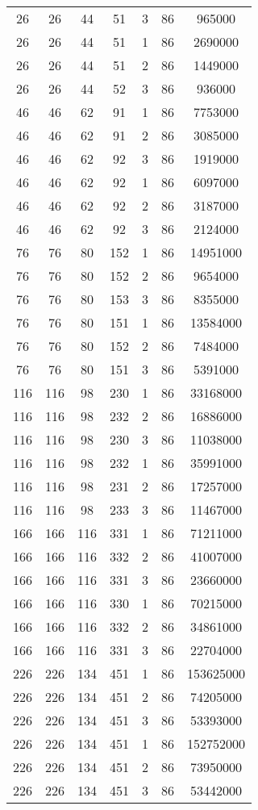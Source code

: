 \documentclass[a4paper,11pt]{article}
\begin{document}
\begin{longtable}{ |c|c|c|c|c|c|c| }
26 & 26 & 44 & 51 & 3 & 86 & 965000 \\
26 & 26 & 44 & 51 & 1 & 86 & 2690000 \\
26 & 26 & 44 & 51 & 2 & 86 & 1449000 \\
26 & 26 & 44 & 52 & 3 & 86 & 936000 \\
46 & 46 & 62 & 91 & 1 & 86 & 7753000 \\
46 & 46 & 62 & 91 & 2 & 86 & 3085000 \\
46 & 46 & 62 & 92 & 3 & 86 & 1919000 \\
46 & 46 & 62 & 92 & 1 & 86 & 6097000 \\
46 & 46 & 62 & 92 & 2 & 86 & 3187000 \\
46 & 46 & 62 & 92 & 3 & 86 & 2124000 \\
76 & 76 & 80 & 152 & 1 & 86 & 14951000 \\
76 & 76 & 80 & 152 & 2 & 86 & 9654000 \\
76 & 76 & 80 & 153 & 3 & 86 & 8355000 \\
76 & 76 & 80 & 151 & 1 & 86 & 13584000 \\
76 & 76 & 80 & 152 & 2 & 86 & 7484000 \\
76 & 76 & 80 & 151 & 3 & 86 & 5391000 \\
116 & 116 & 98 & 230 & 1 & 86 & 33168000 \\
116 & 116 & 98 & 232 & 2 & 86 & 16886000 \\
116 & 116 & 98 & 230 & 3 & 86 & 11038000 \\
116 & 116 & 98 & 232 & 1 & 86 & 35991000 \\
116 & 116 & 98 & 231 & 2 & 86 & 17257000 \\
116 & 116 & 98 & 233 & 3 & 86 & 11467000 \\
166 & 166 & 116 & 331 & 1 & 86 & 71211000 \\
166 & 166 & 116 & 332 & 2 & 86 & 41007000 \\
166 & 166 & 116 & 331 & 3 & 86 & 23660000 \\
166 & 166 & 116 & 330 & 1 & 86 & 70215000 \\
166 & 166 & 116 & 332 & 2 & 86 & 34861000 \\
166 & 166 & 116 & 331 & 3 & 86 & 22704000 \\
226 & 226 & 134 & 451 & 1 & 86 & 153625000 \\
226 & 226 & 134 & 451 & 2 & 86 & 74205000 \\
226 & 226 & 134 & 451 & 3 & 86 & 53393000 \\
226 & 226 & 134 & 451 & 1 & 86 & 152752000 \\
226 & 226 & 134 & 451 & 2 & 86 & 73950000 \\
226 & 226 & 134 & 451 & 3 & 86 & 53442000 \\

       \hline
    \end{longtable}
  
\end{document}
